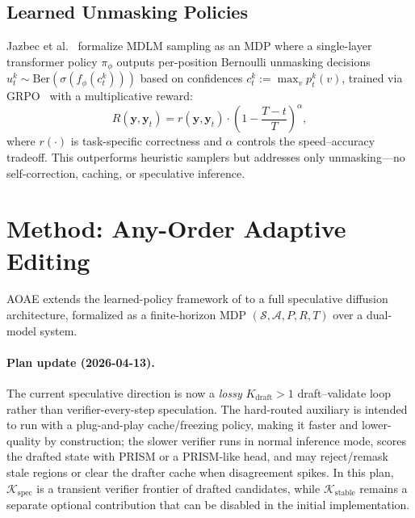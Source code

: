 \documentclass[11pt]{article}
\newcommand{\cK}{\mathcal{K}}
\newcommand{\cS}{\mathcal{S}}
\newcommand{\cA}{\mathcal{A}}
\newcommand{\by}{\mathbf{y}}
\begin{document}
\subsection{Learned Unmasking Policies}
\label{sec:bg_rl}

Jazbec et al.~\cite{jazbec2025learning} formalize MDLM sampling as an MDP where a single-layer transformer policy $\pi_\phi$ outputs per-position Bernoulli unmasking decisions $u_t^k \sim \text{Ber}(\sigma(f_\phi(c_t^k)))$ based on confidences $c_t^k := \max_v p_t^k(v)$, trained via GRPO~\cite{shao2024deepseekmath} with a multiplicative reward:
\begin{equation}
    R(\by, \by_t) = r(\by, \by_t) \cdot \left(1 - \frac{T - t}{T}\right)^\alpha,
    \label{eq:rl_reward}
\end{equation}
where $r(\cdot)$ is task-specific correctness and $\alpha$ controls the speed--accuracy tradeoff.
This outperforms heuristic samplers but addresses only unmasking---no self-correction, caching, or speculative inference.

\section{Method: Any-Order Adaptive Editing}
\label{sec:method}

AOAE extends the learned-policy framework of  to a full speculative diffusion architecture, formalized as a finite-horizon MDP $(\cS, \cA, P, R, T)$ over a dual-model system.

\paragraph{Plan update (2026-04-13).}
The current speculative direction is now a \emph{lossy} $K_{\text{draft}}{>}1$ draft--validate loop rather than verifier-every-step speculation. The hard-routed auxiliary is intended to run with a plug-and-play cache/freezing policy, making it faster and lower-quality by construction; the slower verifier runs in normal inference mode, scores the drafted state with PRISM or a PRISM-like head, and may reject/remask stale regions or clear the drafter cache when disagreement spikes. In this plan, $\cK_{\mathrm{spec}}$ is a transient verifier frontier of drafted candidates, while $\cK_{\mathrm{stable}}$ remains a separate optional contribution that can be disabled in the initial implementation.
\end{document}
